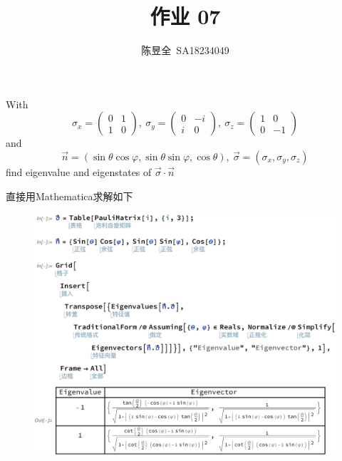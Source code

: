 \documentclass[UTF8,12pt]{article} %
\makeatletter
\newenvironment{proof}[1][\protect\proofname]{\par
\normalfont\topsep6\p@\@plus6\p@\relax
\trivlist
\itemindent\parindent
\item[\hskip\labelsep
\scshape
#1]\ignorespaces
}{%
\endtrivlist\@endpefalse
}
\renewcommand{\proofname}{\it{Solution}}
\makeatother
\begin{document}
\title{作业 07}
\author{陈昱全~SA18234049}
\date{} %
\maketitle

\begin{exercise}{}{}
With $$\sigma_x = \begin{pmatrix}0&1\\1&0\end{pmatrix},~ \sigma_y = \begin{pmatrix}0&-i\\i&0\end{pmatrix},~ \sigma_z = \begin{pmatrix}1&0\\0&-1\end{pmatrix}$$ and $$\vec{n} = (\sin\theta \cos\varphi, \sin\theta \sin\varphi, \cos\theta),~ \vec{\sigma} = (\sigma_x, \sigma_y, \sigma_z)$$ find eigenvalue and eigenstates of $\vec{\sigma}\cdot\vec{n}$
\end{exercise}

\begin{proof}[解]
直接用Mathematica求解如下
\begin{figure}[H]
\begin{center}
\includegraphics[width=15cm]{prob1}
\end{center}
\end{figure}
\end{proof}
\end{document}
